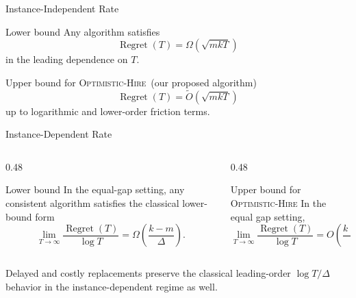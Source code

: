 \documentclass[10pt,aspectratio=169]{beamer}
\newcommand{\OH}{\textsc{Optimistic-Hire}}
\newcommand{\Regret}{\operatorname{Regret}}
\begin{document}
\begin{frame}[t]{Instance-Independent Rate}
\begin{block}{Lower bound}
Any algorithm satisfies
\[
\Regret(T)=\Omega\!\left(\sqrt{mkT}\right)
\]
in the leading dependence on \(T\).
\end{block}

\begin{block}{Upper bound for \OH\ (our proposed algorithm)}
\[
\Regret(T)=\tilde O\!\left(\sqrt{mkT}\right)
\]
up to logarithmic and lower-order friction terms.
\end{block}
\end{frame}

\begin{frame}[t]{Instance-Dependent Rate}
\begin{columns}[T,onlytextwidth]
    \begin{column}{0.48\textwidth}
        \begin{block}{Lower bound}
        In the equal-gap setting, any consistent algorithm satisfies the classical lower-bound form
        \[
            \lim_{T\to \infty}\frac{\Regret(T)}{\log T}=\Omega\!\left(\frac{k-m}{\Delta}\right).
        \]
        \end{block}
    \end{column}

    \begin{column}{0.48\textwidth}
        \begin{block}{Upper bound for \OH}
        In the equal gap setting,
        \[
            \lim_{T\to \infty}\frac{\Regret(T)}{\log T}=
            O\!\left(\frac{k-m}{\Delta}\right)
        \]
        \end{block}
    \end{column}
\end{columns}

\vspace{0.6em}
Delayed and costly replacements preserve the classical leading-order \(\log T / \Delta\) behavior in the instance-dependent regime as well.
\end{frame}
\end{document}

